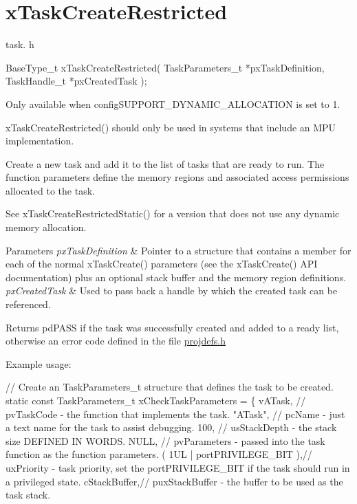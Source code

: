 \hypertarget{group__x_task_create_restricted}{}\section{x\+Task\+Create\+Restricted}
\label{group__x_task_create_restricted}
task. h 
\begin{DoxyPre}
 BaseType\_t xTaskCreateRestricted( TaskParameters\_t *pxTaskDefinition, TaskHandle\_t *pxCreatedTask );\end{DoxyPre}


Only available when config\+S\+U\+P\+P\+O\+R\+T\+\_\+\+D\+Y\+N\+A\+M\+I\+C\+\_\+\+A\+L\+L\+O\+C\+A\+T\+I\+ON is set to 1.

x\+Task\+Create\+Restricted() should only be used in systems that include an M\+PU implementation.

Create a new task and add it to the list of tasks that are ready to run. The function parameters define the memory regions and associated access permissions allocated to the task.

See x\+Task\+Create\+Restricted\+Static() for a version that does not use any dynamic memory allocation.


\begin{DoxyParams}{Parameters}
{\em px\+Task\+Definition} & Pointer to a structure that contains a member for each of the normal x\+Task\+Create() parameters (see the x\+Task\+Create() A\+PI documentation) plus an optional stack buffer and the memory region definitions.\\
\hline
{\em px\+Created\+Task} & Used to pass back a handle by which the created task can be referenced.\\
\hline
\end{DoxyParams}
\begin{DoxyReturn}{Returns}
pd\+P\+A\+SS if the task was successfully created and added to a ready list, otherwise an error code defined in the file \mbox{\hyperlink{projdefs_8h_source}{projdefs.\+h}}
\end{DoxyReturn}
Example usage\+: 
\begin{DoxyPre}
// Create an TaskParameters\_t structure that defines the task to be created.
static const TaskParameters\_t xCheckTaskParameters =
\{
    vATask,     // pvTaskCode - the function that implements the task.
    "ATask",    // pcName - just a text name for the task to assist debugging.
    100,        // usStackDepth - the stack size DEFINED IN WORDS.
    NULL,       // pvParameters - passed into the task function as the function parameters.
    ( 1UL | portPRIVILEGE\_BIT ),// uxPriority - task priority, set the portPRIVILEGE\_BIT if the task should run in a privileged state.
    cStackBuffer,// puxStackBuffer - the buffer to be used as the task stack.\end{DoxyPre}



